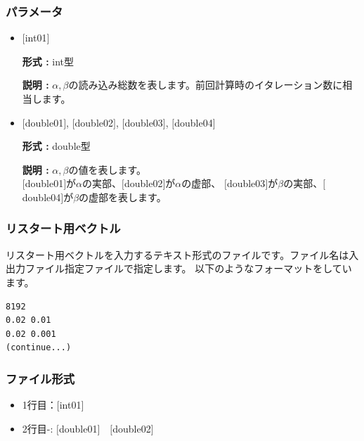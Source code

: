 \documentclass[12pt,titlepage]{jarticle}
\begin{document}
\subsubsection{パラメータ}
 \begin{itemize}

  \item  $[$int01$]$

 {\bf 形式 :} int型

{\bf 説明 :} $\alpha, \beta$の読み込み総数を表します。前回計算時のイタレーション数に相当します。
 
 \item  $[$double01$]$, $[$double02$]$, $[$double03$]$, $[$double04$]$

 {\bf 形式 :} double型 

{\bf 説明 :} $\alpha, \beta$の値を表します。\\
$[$double01$]$が$\alpha$の実部、$[$double02$]$が$\alpha$の虚部、
$[$double03$]$が$\beta$の実部、$[$double04$]$が$\beta$の虚部を表します。\\
\end{itemize}


\newpage
\subsubsection{リスタート用ベクトル}\label{subsubsec:revec}
リスタート用ベクトルを入力するテキスト形式のファイルです。ファイル名は入出力ファイル指定ファイルで指定します。
以下のようなフォーマットをしています。
\\
\begin{minipage}{10cm}
\begin{screen}
\begin{verbatim}
8192
0.02 0.01
0.02 0.001
(continue...)
\end{verbatim}
\end{screen}
\end{minipage}


\subsubsection{ファイル形式}
 \begin{itemize}
   \item  1行目：$[$int01$]$
   \item  2行目-: $[$double01$]$~~$[$double02$]$
  \end{itemize}
\end{document}

